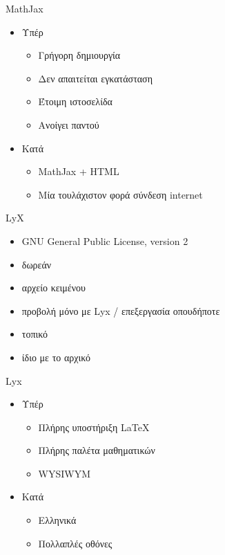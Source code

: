 \documentclass[greek]{beamer}
\begin{document}
\begin{frame}{MathJax}
  \begin{itemize}
    \item Υπέρ
      \begin{itemize}
        \item<2-> Γρήγορη δημιουργία
        \item<3-> Δεν απαιτείται εγκατάσταση
        \item<4-> Έτοιμη ιστοσελίδα
        \item<5-> Ανοίγει παντού
      \end{itemize}
    \item Κατά
      \begin{itemize}
        \item<6-> MathJax + HTML
        \item<7-> Μία τουλάχιστον φορά σύνδεση internet
      \end{itemize}
  \end{itemize}
\end{frame}

\begin{frame}{LyX}
  \begin{itemize}
    \item GNU General Public License, version 2
    \item δωρεάν
    \item αρχείο κειμένου
    \item προβολή μόνο με Lyx / επεξεργασία οπουδήποτε
    \item τοπικό
    \item ίδιο με το αρχικό
  \end{itemize}
\end{frame}

\begin{frame}{Lyx}
  \begin{itemize}
    \item Υπέρ
      \begin{itemize}
        \item<2-> Πλήρης υποστήριξη \LaTeX
        \item<3-> Πλήρης παλέτα μαθηματικών
        \item<4-> WYSIWYM
      \end{itemize}
    \item Κατά
      \begin{itemize}
        \item<6-> Ελληνικά
        \item<7-> Πολλαπλές οθόνες
      \end{itemize}
  \end{itemize}
\end{frame}
\end{document}

